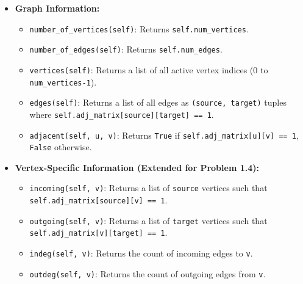 \documentclass{article}
\begin{document}
\begin{itemize}
\begin{itemize}
        \item \textbf{Graph Information:}
        \begin{itemize}
            \item \texttt{number\_of\_vertices(self)}: Returns \texttt{self.num\_vertices}.
            \item \texttt{number\_of\_edges(self)}: Returns \texttt{self.num\_edges}.
            \item \texttt{vertices(self)}: Returns a list of all active vertex indices (0 to \texttt{num\_vertices-1}).
            \item \texttt{edges(self)}: Returns a list of all edges as \texttt{(source, target)} tuples where \texttt{self.adj\_matrix[source][target] == 1}.
            \item \texttt{adjacent(self, u, v)}: Returns \texttt{True} if \texttt{self.adj\_matrix[u][v] == 1}, \texttt{False} otherwise.
        \end{itemize}

        \item \textbf{Vertex-Specific Information (Extended for Problem 1.4):}
        \begin{itemize}
            \item \texttt{incoming(self, v)}: Returns a list of \texttt{source} vertices such that \texttt{self.adj\_matrix[source][v] == 1}.
            \item \texttt{outgoing(self, v)}: Returns a list of \texttt{target} vertices such that \texttt{self.adj\_matrix[v][target] == 1}.
            \item \texttt{indeg(self, v)}: Returns the count of incoming edges to \texttt{v}.
            \item \texttt{outdeg(self, v)}: Returns the count of outgoing edges from \texttt{v}.
        \end{itemize}


\end{itemize}
\end{itemize}
\end{document}
